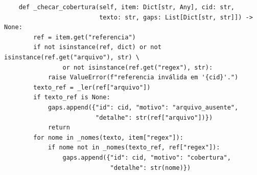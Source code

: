 \documentclass[12pt,openany,oneside,a4paper,brazil,chapter=TITLE]{abntex2}
\begin{document}
\begin{lstlisting}
    def _checar_cobertura(self, item: Dict[str, Any], cid: str,
                          texto: str, gaps: List[Dict[str, str]]) -> None:
        ref = item.get("referencia")
        if not isinstance(ref, dict) or not isinstance(ref.get("arquivo"), str) \
                or not isinstance(ref.get("regex"), str):
            raise ValueError(f"referencia inválida em '{cid}'.")
        texto_ref = _ler(ref["arquivo"])
        if texto_ref is None:
            gaps.append({"id": cid, "motivo": "arquivo_ausente",
                         "detalhe": str(ref["arquivo"])})
            return
        for nome in _nomes(texto, item["regex"]):
            if nome not in _nomes(texto_ref, ref["regex"]):
                gaps.append({"id": cid, "motivo": "cobertura",
                             "detalhe": str(nome)})
\end{lstlisting}
\end{document}

